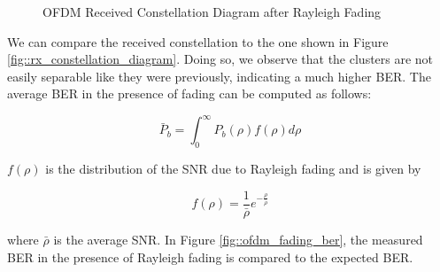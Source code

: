 \documentclass[conference]{IEEEtran}
\begin{document}
      \begin{figure}[H]
		\centering
    		\caption{OFDM Received Constellation Diagram after Rayleigh Fading}
    		\label{fig::ofdm_rayleigh_fading}
  	  \end{figure}
    
    		We can compare the received constellation to the one shown in Figure \ref{fig::rx_constellation_diagram}. Doing so, we observe that the clusters are not easily separable like they were previously, indicating a much higher BER. The average BER in the presence of fading can be computed as follows:
    		
    		\begin{equation}
    			\bar{P}_b = \int_{0}^{\infty}{P_b(\rho)f(\rho)d\rho}
    		\end{equation}
    		
    		$f(\rho)$ is the distribution of the SNR due to Rayleigh fading and is given by
    		
    		\begin{equation}
    			f(\rho) = \frac{1}{\bar{\rho}}e^{-\frac{\rho}{\bar{\rho}}}
    		\end{equation}
    			
    		where $\bar{\rho}$ is the average SNR. In Figure \ref{fig::ofdm_fading_ber}, the measured BER in the presence of Rayleigh fading is compared to the expected BER.
    		
\end{document}
